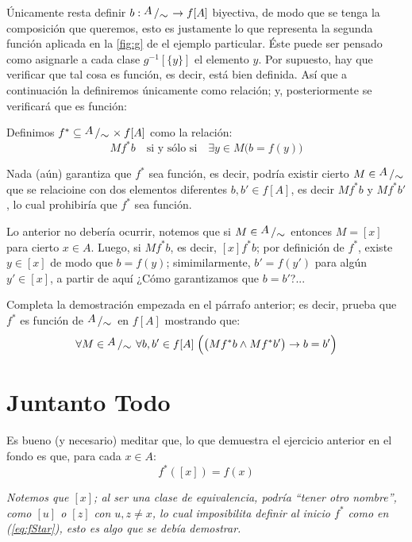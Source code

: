 \documentclass[letterpaper,DIV=14,headsepline,12pt]{scrartcl}
\newcommand{\pts}{}
\newenvironment{ejercicio}[1]{\ifthenelse{\equal{#1}{1} \OR \equal{#1}{+1}}{\renewcommand{\pts}{\textbf{(#1 pt)}}}{\renewcommand{\pts}{\textbf{(#1 pts)}}}\begin{ejj}\upshape \pts}{\end{ejj}}
\newcommand{\quot}[2]{{\raisebox{.2em}{$#1$}\left/\raisebox{-.2em}{$#2$}\right.}}
\begin{document}
    Únicamente resta definir $b:\quot{A}{\sim} \to f[A]$ biyectiva, de modo que se tenga la composición que queremos, esto es justamente lo que representa la segunda función aplicada en la \autoref{fig:g} de el ejemplo particular. Éste puede ser pensado como asignarle a cada clase $g^{-1}[\{y\}]$ el elemento $y$. Por supuesto, hay que verificar que tal cosa es función, es decir, está bien definida. Así que a continuación la definiremos únicamente como relación; y, posteriormente se verificará que es función:
    \begin{definicion}
        Definimos $f^* \subseteq \quot{A}{\sim} \times f[A]$ como la relación:
        \[  M f^* b \quad \text{si y sólo si} \quad \exists y \in M \big( b=f(y) \big) \]
    \end{definicion}

    Nada (aún) garantiza que $f^*$ sea función, es decir, podría existir cierto $M \in \quot{A}{\sim}$ que se relacioine con dos elementos diferentes $b,b' \in f[A]$, es decir $M f^* b$ y $M f^* b'$, lo cual prohibiría que $f^*$ sea función.
    
    Lo anterior no debería ocurrir, notemos que si $M \in \quot{A}{\sim}$ entonces $M=[x]$ para cierto $x \in A$. Luego, si $M f^* b$, es decir, $[x] f^* b$; por definición de $f^*$, existe $y \in [x]$ de modo que $b=f(y)$; simimilarmente, $b'=f(y')$ para algún $y'\in[x]$, a partir de aquí ¿Cómo garantizamos que $b=b'$?...

    \begin{ejercicio}{1.5}\label{ej:fStar}
        Completa la demostración empezada en el párrafo anterior; es decir, prueba que $f^*$ es función de $\quot{A}{\sim}$ en $f[A]$ mostrando que:
        \[ \forall M \in \quot{A}{\sim} \; \forall b,b' \in f[A] \; \Big( \big( M f^* b \land M f^* b' \big) \to b=b' \Big) \]
    \end{ejercicio}

    \section*{Juntanto Todo}

    Es bueno (y necesario) meditar que, lo que demuestra el ejercicio anterior en el fondo es que, para cada $x \in A$:
    \begin{equation}\label{eq:fStar}
        f^*([x])=f(x)
    \end{equation}

    \textit{Notemos que $[x]$; al ser una clase de equivalencia, podría ``tener otro nombre'', como $[u]$ o $[z]$ con $u,z \neq x$, lo cual imposibilita definir al inicio $f^*$ como en (\ref{eq:fStar}), esto es algo que se debía demostrar.}
\end{document}
